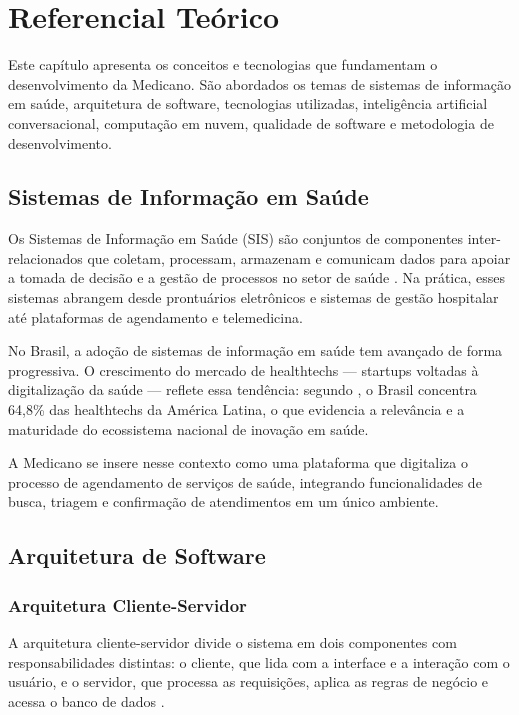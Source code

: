 \chapter{Referencial Teórico}
\label{chap:theoretical-background}

Este capítulo apresenta os conceitos e tecnologias que
fundamentam o desenvolvimento da Medicano. São abordados
os temas de sistemas de informação em saúde, arquitetura
de software, tecnologias utilizadas, inteligência artificial
conversacional, computação em nuvem, qualidade de software
e metodologia de desenvolvimento.

\section{Sistemas de Informação em Saúde}
\label{sec:health-information-systems}

Os Sistemas de Informação em Saúde (SIS) são conjuntos de
componentes inter-relacionados que coletam, processam,
armazenam e comunicam dados para apoiar a tomada de decisão
e a gestão de processos no setor de saúde \cite{laudon2014}.
Na prática, esses sistemas abrangem desde prontuários
eletrônicos e sistemas de gestão hospitalar até plataformas
de agendamento e telemedicina.

No Brasil, a adoção de sistemas de informação em saúde
tem avançado de forma progressiva. O crescimento do
mercado de healthtechs — startups voltadas à digitalização
da saúde — reflete essa tendência: segundo
, o Brasil concentra 64,8\% das
healthtechs da América Latina, o que evidencia a
relevância e a maturidade do ecossistema nacional de
inovação em saúde.

A Medicano se insere nesse contexto como uma plataforma
que digitaliza o processo de agendamento de serviços de
saúde, integrando funcionalidades de busca, triagem e
confirmação de atendimentos em um único ambiente.

\section{Arquitetura de Software}
\label{sec:software-architecture}

\subsection{Arquitetura Cliente-Servidor}
\label{subsec:client-server}

A arquitetura cliente-servidor divide o sistema em dois
componentes com responsabilidades distintas: o cliente,
que lida com a interface e a interação com o usuário, e
o servidor, que processa as requisições, aplica as regras
de negócio e acessa o banco de dados \cite{sommerville2011}.

